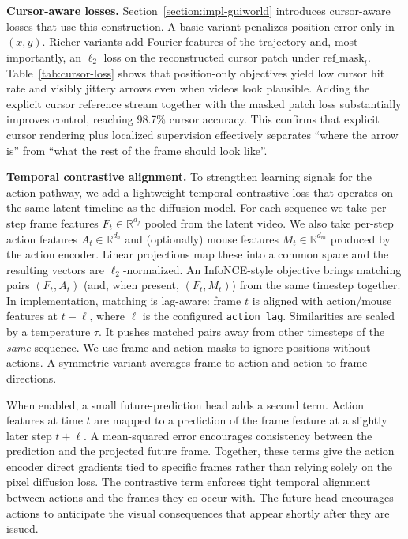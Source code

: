 \noindent\textbf{Cursor-aware losses.}
Section~\ref{section:impl-guiworld} introduces cursor-aware losses that use this construction.
A basic variant penalizes position error only in $(x,y)$.
Richer variants add Fourier features of the trajectory and, most importantly, an $\ell_2$ loss on the reconstructed cursor patch under $\mathrm{ref\_mask}_t$.
Table~\ref{tab:cursor-loss} shows that position-only objectives yield low cursor hit rate and visibly jittery arrows even when videos look plausible.
Adding the explicit cursor reference stream together with the masked patch loss substantially improves control, reaching 98.7\% cursor accuracy.
This confirms that explicit cursor rendering plus localized supervision effectively separates ``where the arrow is'' from ``what the rest of the frame should look like''.

\noindent\textbf{Temporal contrastive alignment.}
To strengthen learning signals for the action pathway, we add a lightweight temporal contrastive loss that operates on the same latent timeline as the diffusion model.
For each sequence we take per-step frame features $F_{t} \in \mathbb{R}^{d_f}$ pooled from the latent video.
We also take per-step action features $A_{t} \in \mathbb{R}^{d_a}$ and (optionally) mouse features $M_{t} \in \mathbb{R}^{d_m}$ produced by the action encoder.
Linear projections map these into a common space and the resulting vectors are $\ell_2$-normalized.
An InfoNCE-style objective brings matching pairs $(F_t,A_t)$ (and, when present, $(F_t,M_t)$) from the same timestep together.
In implementation, matching is lag-aware: frame $t$ is aligned with action/mouse features at $t-\ell$, where $\ell$ is the configured \texttt{action\_lag}.
Similarities are scaled by a temperature $\tau$.
It pushes matched pairs away from other timesteps of the \emph{same} sequence.
We use frame and action masks to ignore positions without actions.
A symmetric variant averages frame-to-action and action-to-frame directions.

When enabled, a small future-prediction head adds a second term.
Action features at time $t$ are mapped to a prediction of the frame feature at a slightly later step $t+\ell$.
A mean-squared error encourages consistency between the prediction and the projected future frame.
Together, these terms give the action encoder direct gradients tied to specific frames rather than relying solely on the pixel diffusion loss.
The contrastive term enforces tight temporal alignment between actions and the frames they co-occur with.
The future head encourages actions to anticipate the visual consequences that appear shortly after they are issued.

